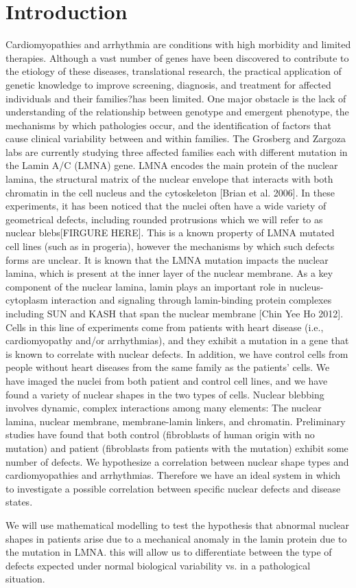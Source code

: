 \section{Introduction}
Cardiomyopathies and arrhythmia are conditions with high morbidity and limited therapies. Although a vast number of genes have been discovered to contribute to the etiology of these diseases, translational research, the practical application of genetic knowledge to improve screening, diagnosis, and treatment for affected individuals and their families?has been limited. One major obstacle is the lack of understanding of the relationship between genotype and emergent phenotype, the mechanisms by which pathologies occur, and the identification of factors that cause clinical variability between and within families. The Grosberg and Zargoza labs are currently studying three affected families each with different mutation in the Lamin A/C (LMNA) gene.  LMNA encodes the main protein of the nuclear lamina, the structural matrix of the nuclear envelope that interacts with both chromatin in the cell nucleus and the cytoskeleton [Brian et al. 2006]. In these experiments, it has been noticed that the nuclei often have a wide variety of geometrical defects, including rounded protrusions which we will refer to as nuclear blebs[FIRGURE HERE]. This is a known property of LMNA mutated cell lines (such as in progeria), however the mechanisms by which such defects forms are unclear. It is known that the LMNA mutation impacts the nuclear lamina, which is present at the inner layer of the nuclear membrane. As a key component of the nuclear lamina, lamin plays an important role in nucleus-cytoplasm interaction and signaling through lamin-binding protein complexes including SUN and KASH that span the nuclear membrane [Chin Yee Ho 2012]. Cells in this line of experiments come from patients with heart disease (i.e., cardiomyopathy and/or arrhythmias), and they exhibit a mutation in a gene that is known to correlate with nuclear defects. In addition, we have control cells from people without heart diseases from the same family as the patients' cells.  We have imaged the nuclei from both patient and control cell lines, and we have found a variety of nuclear shapes in the two types of cells. Nuclear blebbing involves dynamic, complex interactions among many elements: The nuclear lamina, nuclear membrane, membrane-lamin linkers, and chromatin. Preliminary studies have found that both control (fibroblasts of human origin with no mutation) and patient (fibroblasts from patients with the mutation) exhibit some number of defects. We hypothesize a correlation between nuclear shape types and cardiomyopathies and arrhythmias. Therefore we have an ideal system in which to investigate a possible correlation between specific nuclear defects and disease states.

We will use mathematical modelling to test the hypothesis that abnormal nuclear shapes in patients arise due to a mechanical anomaly in the lamin protein due to the mutation in LMNA. this will allow us to differentiate between the type of defects expected under normal biological variability vs. in a pathological situation. 